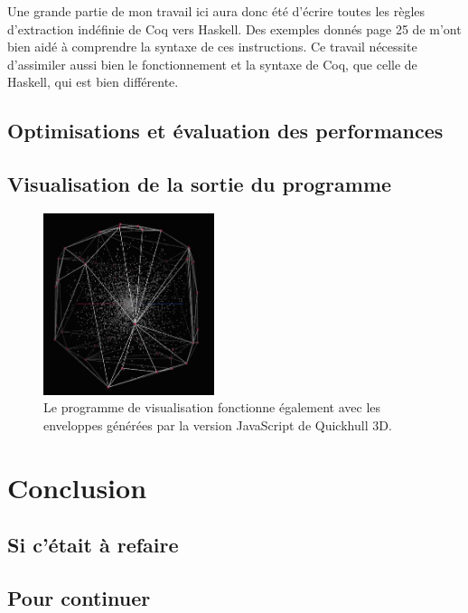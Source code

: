 \documentclass[]{article}
\begin{document}
Une grande partie de mon travail ici aura donc été d'écrire toutes les règles d'extraction indéfinie de Coq vers Haskell. Des exemples donnés page 25 de \cite{magaud:hal-01066671} m'ont bien aidé à comprendre la syntaxe de ces instructions. Ce travail nécessite d'assimiler aussi bien le fonctionnement et la syntaxe de Coq, que celle de Haskell, qui est bien différente.

\subsection{Optimisations et évaluation des performances}

\subsection{Visualisation de la sortie du programme}

\begin{figure}[H]
	\begin{center}
		\includegraphics[width=5cm]{viewer/screen1.png}
	\end{center}
	\caption{Le programme de visualisation fonctionne également avec les enveloppes générées par la version JavaScript de Quickhull 3D.}
\end{figure}

\section{Conclusion}
\subsection{Si c'était à refaire}
\subsection{Pour continuer}

\newpage


\end{document}
